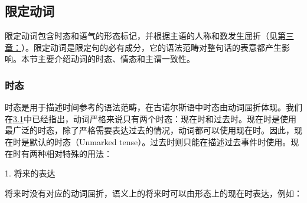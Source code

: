 \subsection{限定动词}\label{ux9650ux5b9aux52a8ux8bcd}

限定动词包含时态和语气的形态标记，并根据主语的人称和数发生屈折（见\hyperref[ux52a8ux8bcdux4e0eux53d8ux4f4dux6cd5]{第三章：}）。限定动词是限定句的必有成分，它的语法范畴对整句话的表意都产生影响。本节主要介绍动词的时态、情态和主谓一致性。

\subsubsection{时态}\label{ux65f6ux6001}

时态是用于描述时间参考的语法范畴，在古诺尔斯语中时态由动词屈折体现。我们在\hyperref[ux52a8ux8bcdux7684ux6982ux8ff0]{3.1}中已经指出，动词严格来说只有两个时态：现在时和过去时。现在时是使用最广泛的时态，除了严格需要表达过去的情况，动词都可以使用现在时。因此，现在时是默认的时态（Unmarked
tense）。过去时则只能在描述过去事件时使用。现在时有两种相对特殊的用法：

1. 将来的表达

将来时没有对应的动词屈折，语义上的将来时可以由形态上的现在时表达，例如：

